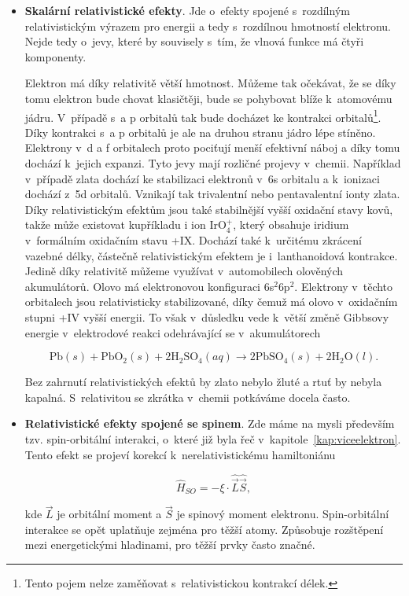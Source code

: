 \begin{itemize} 

\item \textbf{Skalární relativistické efekty}. Jde o~efekty spojené s~rozdílným relativistickým výrazem pro energii a tedy s~rozdílnou hmotností elektronu. Nejde tedy o~jevy, které by souvisely s~tím, že vlnová funkce má čtyři komponenty. 

Elektron má díky relativitě větší hmotnost. Můžeme tak očekávat, že se díky tomu elektron bude chovat klasičtěji, bude se pohybovat blíže k~atomovému jádru. V~případě s~a p orbitalů tak bude docházet ke kontrakci orbitalů\footnote{Tento pojem nelze zaměňovat s~relativistickou kontrakcí délek.}. Díky kontrakci s~a p orbitalů je ale na druhou stranu jádro lépe stíněno. Elektrony v~d a f orbitalech proto pociťují menší efektivní náboj a díky tomu dochází k~jejich expanzi. Tyto jevy mají rozličné projevy v~chemii. Například v~případě zlata dochází ke stabilizaci elektronů v~6s orbitalu a k~ionizaci dochází z~5d orbitalů. Vznikají tak trivalentní nebo pentavalentní ionty zlata. Díky relativistickým efektům jsou také stabilnější vyšší oxidační stavy kovů, takže může existovat kupříkladu i ion IrO$_4^+$, který obsahuje iridium v~formálním oxidačním stavu +IX. Dochází také k~určitému zkrácení vazebné délky, částečně relativistickým efektem je i~lanthanoidová kontrakce. Jedině díky relativitě můžeme využívat v~automobilech olověných akumulátorů. Olovo má elektronovou konfiguraci 6s$^2$6p$^2$. Elektrony v~těchto orbitalech jsou relativisticky stabilizované, díky čemuž má olovo v~oxidačním stupni +IV vyšší energii. To však v~důsledku vede k~větší změně Gibbsovy energie v~elektrodové reakci odehrávající se v~akumulátorech

\begin{equation}
\mbox{Pb}(s) + \mbox{PbO}_2(s) + 2 \mbox{H}_2\mbox{SO}_4 (aq) \rightarrow 2 \mbox{PbSO}_4 (s) + 2 \mbox{H}_2\mbox{O} (l).
\label{rov:Rel-10}
\end{equation}

\noindent Bez zahrnutí relativistických efektů by zlato nebylo žluté a rtuť by nebyla kapalná. S~relativitou se zkrátka v~chemii potkáváme docela často. 

\item \textbf{Relativistické efekty spojené se spinem}. Zde máme na mysli především tzv. spin-orbitální interakci, o~které již byla řeč v~kapitole~\ref{kap:viceelektron}. Tento efekt se projeví korekcí k~nerelativistickému hamiltoniánu

\begin{equation}
\hat{H}_{SO} = - \xi \cdot \hat{\vec{L}} \hat{\vec{S}},
\label{rov:Rel-11}
\end{equation}

\noindent
kde $\vec{L}$ je orbitální moment a $\vec{S}$ je spinový moment elektronu. Spin-orbitální interakce se opět uplatňuje zejména pro těžší atomy. Způsobuje rozštěpení mezi energetickými hladinami, pro těžší prvky často značné.

\end{itemize}

